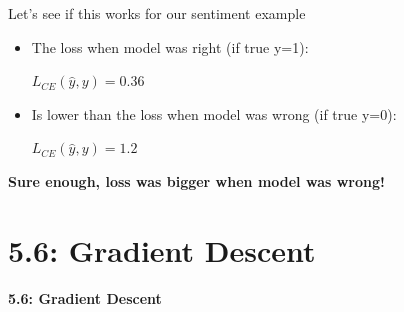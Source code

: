\documentclass[13.5pt,aspecratio=169]{beamer}
\begin{document}
\begin{frame}{Let’s see if this works for our sentiment example}
    \begin{block}{}
         \begin{itemize}
           \item  The loss when model was right (if true y=1):
           \centerline{$L_{CE}(\hat{y},y) = 0.36$}
           \item Is lower than the loss when model was wrong (if true y=0):
            \centerline{$L_{CE} (\hat{y},y) = 1.2$}
        \end{itemize}
    \end{block}
    \Large \textbf{Sure enough, loss was bigger when model was wrong!
}
\end{frame}

\section{5.6: Gradient Descent} %

\begin{frame}
    \bigskip
    \color{blue} \Huge \textbf{5.6: Gradient Descent} 
\end{frame}

\end{document}
